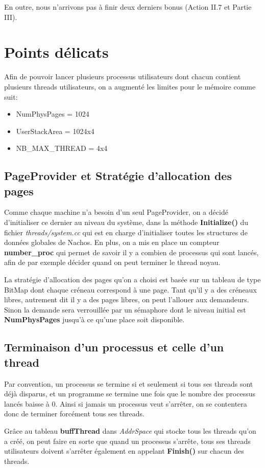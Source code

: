 \documentclass[12pt,a4paper]{article}
\begin{document}
En outre, nous n'arrivons pas à finir deux derniers bonus (Action II.7 et Partie III).

\section{Points délicats}

Afin de pouvoir lancer plusieurs processus utilisateurs dont chacun contient plusieurs threads utilisateurs, on a augmenté les limites pour le mémoire comme suit:
\begin{itemize}
\item NumPhysPages = 1024
\item UserStackArea = 1024x4
\item NB\_MAX\_THREAD = 4x4
\end{itemize}

\subsection{PageProvider et Stratégie d'allocation des pages}
Comme chaque machine n'a besoin d'un seul PageProvider, on a décidé d'initialiser ce dernier au niveau du système, dans la méthode \textbf{Initialize()} du fichier \textit{threads/system.cc} qui est en charge d'initialiser toutes les structures de données globales de Nachos. En plus, on a mis en place un compteur \textbf{number\_proc} qui permet de savoir il y a combien de processus qui sont lancés, afin de par exemple décider quand on peut terminer le thread noyau.

La stratégie d'allocation des pages qu'on a choisi est basée sur un tableau de type BitMap dont chaque créneau correspond à une page. Tant qu'il y a des créneaux libres, autrement dit il y a des pages libres, on peut l'allouer aux demandeurs. Sinon la demande sera verrouillée par un sémaphore dont le niveau initial est \textbf{NumPhysPages} jusqu'à ce qu'une place soit disponible.

\subsection{Terminaison d'un processus et celle d'un thread}
Par convention, un processus se termine si et seulement si tous ses threads sont déjà disparus, et un programme se termine une fois que le nombre des processus lancés baisse à 0. Ainsi si jamais un processus veut s'arrêter, on se contentera donc de terminer forcément tous ses threads.

Grâce au tableau \textbf{buffThread} dans \textit{AddrSpace} qui stocke tous les threads qu'on a créé, on peut faire en sorte que quand un processus s'arrête, tous ses threads utilisateurs doivent s'arrêter également en appelant \textbf{Finish()} sur chacun des threads.
\end{document}
